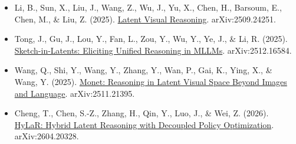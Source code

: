 \vspace{0.25em}
\begin{itemize}
\tightlist
\item
  Li, B., Sun, X., Liu, J., Wang, Z., Wu, J., Yu, X., Chen, H., Barsoum, E., Chen, M., \& Liu, Z. (2025). \href{https://arxiv.org/abs/2509.24251}{Latent Visual Reasoning}. arXiv:2509.24251.
\item
  Tong, J., Gu, J., Lou, Y., Fan, L., Zou, Y., Wu, Y., Ye, J., \& Li, R. (2025). \href{https://arxiv.org/abs/2512.16584}{Sketch-in-Latents: Eliciting Unified Reasoning in MLLMs}. arXiv:2512.16584.
\item
  Wang, Q., Shi, Y., Wang, Y., Zhang, Y., Wan, P., Gai, K., Ying, X., \& Wang, Y. (2025). \href{https://arxiv.org/abs/2511.21395}{Monet: Reasoning in Latent Visual Space Beyond Images and Language}. arXiv:2511.21395.
\item
  Cheng, T., Chen, S.-Z., Zhang, H., Qin, Y., Luo, J., \& Wei, Z. (2026). \href{https://arxiv.org/abs/2604.20328}{HyLaR: Hybrid Latent Reasoning with Decoupled Policy Optimization}. arXiv:2604.20328.
\end{itemize}

\clearpage
